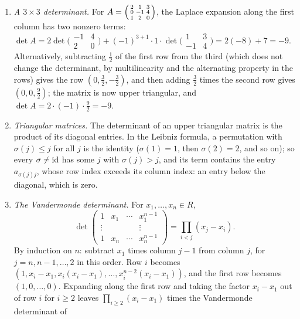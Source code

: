 \begin{example}\label{linear-algebra:example-determinants}
\begin{enumerate}
\item \emph{A $3 \times 3$ determinant.} For $A = \Bigl(\begin{smallmatrix}2 & 1 & 3\\ 0 & -1 & 4\\ 1 & 2 & 0\end{smallmatrix}\Bigr)$, the Laplace expansion along the first column has two nonzero terms:
$\det A = 2\det\bigl(\begin{smallmatrix}-1 & 4\\ 2 & 0\end{smallmatrix}\bigr) + (-1)^{3+1}\cdot1\cdot\det\bigl(\begin{smallmatrix}1 & 3\\ -1 & 4\end{smallmatrix}\bigr) = 2(-8) + 7 = -9$. Alternatively,
subtracting $\frac12$ of the first row from the third (which does not change the determinant, by multilinearity and the alternating property in the rows) gives the row $(0, \frac32, -\frac32)$, and then
adding $\frac32$ times the second row gives $(0, 0, \frac92)$; the matrix is now upper triangular, and $\det A = 2 \cdot (-1) \cdot \frac92 = -9$.
\item \emph{Triangular matrices.} The determinant of an upper triangular matrix is the product of its diagonal entries. In the Leibniz formula, a permutation with $\sigma(j) \leq j$ for all $j$ is the
identity ($\sigma(1) = 1$, then $\sigma(2) = 2$, and so on); so every $\sigma \neq \mathrm{id}$ has some $j$ with $\sigma(j) > j$, and its term contains the entry $a_{\sigma(j)j}$, whose row index exceeds its column
index: an entry below the diagonal, which is zero.
\item \emph{The Vandermonde determinant.} For $x_1, \ldots, x_n \in R$,
\[
\det\begin{pmatrix}1 & x_1 & \cdots & x_1^{n-1}\\ \vdots & & & \vdots\\ 1 & x_n & \cdots & x_n^{n-1}\end{pmatrix} = \prod_{i<j}(x_j - x_i).
\]
By induction on $n$: subtract $x_1$ times column $j - 1$ from column $j$, for $j = n, n - 1, \ldots, 2$ in this order. Row $i$ becomes $(1, x_i - x_1, x_i(x_i - x_1), \ldots, x_i^{n-2}(x_i - x_1))$, and the
first row becomes $(1, 0, \ldots, 0)$. Expanding along the first row and taking the factor $x_i - x_1$ out of row $i$ for $i \geq 2$ leaves $\prod_{i \geq 2}(x_i - x_1)$ times the Vandermonde determinant of

\end{enumerate}
\end{example}
